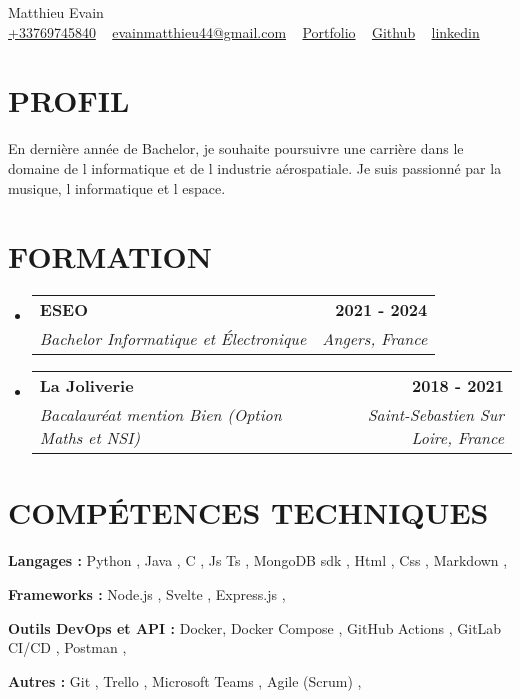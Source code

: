 \documentclass[letterpaper,11pt]{article}
\makeatletter
\newcommand{\resumeItem}[1]{  \item\small{    { #1 \vspace{-1pt}}  }}\newcommand{\classesList}[4]{    \item\small{        { #1 #2 #3 #4 \vspace{-2pt}}  }}\newcommand{\resumeSubheading}[4]{  \vspace{-2pt}\item    \begin{tabular*}{1.0\textwidth}[t]{l@{\extracolsep{\fill}}r}      \textbf{\large #1} & \textbf{\small #2} \\      \textit{\large #3} & \textit{\small #4} \\          \end{tabular*}\vspace{-7pt}}\newcommand{\resumeSingleSubheading}[4]{  \vspace{-2pt}\item    \begin{tabular*}{1.0\textwidth}[t]{l@{\extracolsep{\fill}}r}      \textbf{\large #1} & \textbf{\small #2} \\          \end{tabular*}\vspace{-7pt}}\newcommand{\resumeSubSubheading}[2]{    \item    \begin{tabular*}{0.97\textwidth}{l@{\extracolsep{\fill}}r}      \textit{\small #1} & \textit{\small #2} \\    \end{tabular*}\vspace{-7pt}}\newcommand{\resumeProjectHeading}[2]{    \item    \begin{tabular*}{1.001\textwidth}{l@{\extracolsep{\fill}}r}      \small #1 & \textbf{\small #2}\\    \end{tabular*}\vspace{-7pt}}\newcommand{\resumeSubItem}[1]{\resumeItem{ #1}\vspace{-4pt}}\renewcommand\labelitemi{$\vcenter{\hbox{\tiny$\bullet$}}$}\renewcommand\labelitemii{$\vcenter{\hbox{\tiny$\bullet$}}$}\newcommand{\resumeSubHeadingListStart}{\begin{itemize}[leftmargin=0.0in, label={}]}\newcommand{\resumeSubHeadingListEnd}{\end{itemize}}\newcommand{\resumeItemListStart}{\begin{itemize}[leftmargin=0.1in]}\newcommand{\resumeItemListEnd}{\end{itemize}\vspace{-5pt}}\newcommand\sbullet[1][.5]{\mathbin{\vcenter{\hbox{\scalebox{ #1}{$\bullet$}}}}}
\makeatother
\begin{document}
\begin{center}
  {\huge  Matthieu Evain} \\ \vspace{10pt}
  \href{tel:+33769745840} {\color{blue} +33769745840} ~
  \href{mailto:evainmatthieu44@gmail.com} {\color{blue} evainmatthieu44@gmail.com} ~
   \href{ https://www.matthieu-evain.fr/ } {\color{blue} Portfolio} ~  \href{ https://github.com/matthieuEv } {\color{blue} Github} ~  \href{ https://www.linkedin.com/in/matthieuev/ } {\color{blue} linkedin} ~ 
\end{center}

\section{\color{airforceblue}PROFIL}
  En dernière année de Bachelor, je souhaite poursuivre une carrière dans le domaine de l informatique et de l industrie aérospatiale. Je suis passionné par la musique, l informatique et l espace.
\vspace{-10pt}

\section{\color{airforceblue}FORMATION}
  \resumeSubHeadingListStart
  
    \resumeSubheading
      { ESEO }{ 2021 - 2024}
      { Bachelor Informatique et Électronique }{ Angers, France }
  
    \resumeSubheading
      { La Joliverie }{ 2018 - 2021}
      { Bacalauréat mention Bien (Option Maths et NSI) }{ Saint-Sebastien Sur Loire, France }
  
  \resumeSubHeadingListEnd
  \vspace{-10pt}

\section{\color{airforceblue}COMPÉTENCES TECHNIQUES}
  \begin{itemize}[leftmargin=0in, label={}]
    \small{
      
        \resumeItem{\normalsize{\textbf{ Langages :}
        Python , Java , C , Js Ts , MongoDB sdk , Html , Css , Markdown , 
        }}
      
        \resumeItem{\normalsize{\textbf{ Frameworks :}
        Node.js , Svelte , Express.js , 
        }}
      
        \resumeItem{\normalsize{\textbf{ Outils DevOps et API :}
        Docker, Docker Compose , GitHub Actions , GitLab CI/CD , Postman , 
        }}
      
        \resumeItem{\normalsize{\textbf{ Autres :}
        Git , Trello , Microsoft Teams , Agile (Scrum) , 
        }}
      
    }
 \end{itemize}
 \vspace{-16pt}
\end{document}
